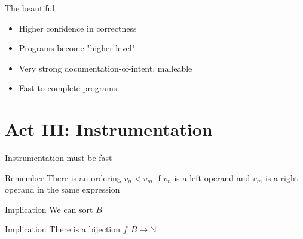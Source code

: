 \documentclass[xcolor = {dvipsnames, table}]{beamer}
\begin{document}
\begin{frame}
    \begin{block}{The beautiful}
        \begin{itemize}
            \item Higher confidence in correctness
            \item Programs become "higher level"
            \item Very strong documentation-of-intent, malleable
            \item Fast to complete programs
        \end{itemize}
    \end{block}
\end{frame}

\section{Act III: Instrumentation}

\begin{frame}
    Instrumentation must be fast
\end{frame}

\begin{frame}
    \begin{block}{Remember}
        There is an ordering $v_n < v_m$ if $v_n$ is a left operand and $v_m$ is
        a right operand in the same expression
    \end{block}

    \begin{block}{Implication}
        We can sort $B$
    \end{block}

    \begin{block}{Implication}
        There is a bijection $f: B \rightarrow \mathbb{N}$
    \end{block}
\end{frame}
\end{document}
